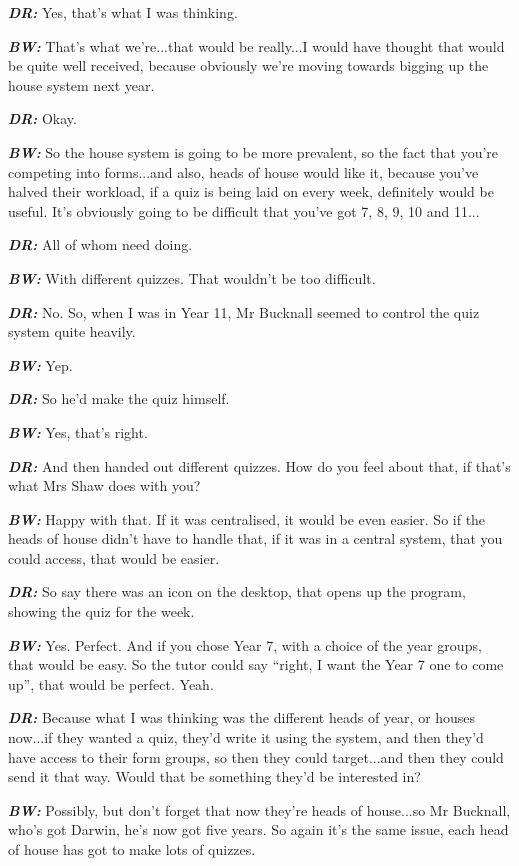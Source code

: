 \textit{\textbf{DR:}} Yes, that's what I was thinking.

\textit{\textbf{BW:}} That's what we're...that would be really...I would have thought that would be quite well received, because obviously we're moving towards bigging up the house system next year.

\textit{\textbf{DR:}} Okay.

\textit{\textbf{BW:}} So the house system is going to be more prevalent, so the fact that you're competing into forms...and also, heads of house would like it, because you've halved their workload, if a quiz is being laid on every week, definitely would be useful. It's obviously going to be difficult that you've got 7, 8, 9, 10 and 11...

\textit{\textbf{DR:}} All of whom need doing.

\textit{\textbf{BW:}} With different quizzes. That wouldn't be too difficult.

\textit{\textbf{DR:}} No. So, when I was in Year 11, Mr Bucknall seemed to control the quiz system quite heavily.

\textit{\textbf{BW:}} Yep.

\textit{\textbf{DR:}} So he'd make the quiz himself.

\textit{\textbf{BW:}} Yes, that's right.

\textit{\textbf{DR:}} And then handed out different quizzes. How do you feel about that, if that's what Mrs Shaw does with you?

\textit{\textbf{BW:}} Happy with that. If it was centralised, it would be even easier. So if the heads of house didn't have to handle that, if it was in a central system, that you could access, that would be easier.

\textit{\textbf{DR:}} So say there was an icon on the desktop, that opens up the program, showing the quiz for the week.

\textit{\textbf{BW:}} Yes. Perfect. And if you chose Year 7, with a choice of the year groups, that would be easy. So the tutor could say ``right, I want the Year 7 one to come up'', that would be perfect. Yeah.

\textit{\textbf{DR:}} Because what I was thinking was the different heads of year, or houses now...if they wanted a quiz, they'd write it using the system, and then they'd have access to their form groups, so then they could target...and then they could send it that way. Would that be something they'd be interested in?

\textit{\textbf{BW:}} Possibly, but don't forget that now they're heads of house...so Mr Bucknall, who's got Darwin, he's now got five years. So again it's the same issue, each head of house has got to make lots of quizzes.

